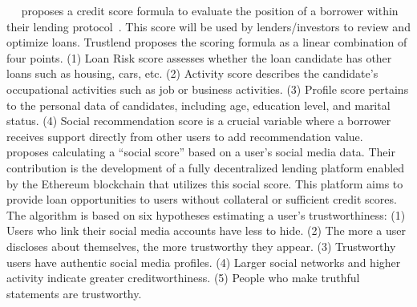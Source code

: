 \documentclass[../ICIT-Paper-2024.tex]{subfiles}
\begin{document}
~\citeauthor{uriawan2024decentralized}~\cite{uriawan2024decentralized} proposes a credit score formula to evaluate the position of a borrower within their lending protocol~\cite{uriawan2022trustlend}. This score will be used by lenders/investors to review and optimize loans. Trustlend proposes the scoring formula as a linear combination of four points. (1) Loan Risk score assesses whether the loan candidate has other loans such as housing, cars, etc. (2) Activity score describes the candidate's occupational activities such as job or business activities. (3) Profile score pertains to the personal data of candidates, including age, education level, and marital status. (4) Social recommendation score is a crucial variable where a borrower receives support directly from other users to add recommendation value.
~\citeauthor{hartmann2023privacy}~\cite{hartmann2023privacy} proposes calculating a “social score” based on a user's social media data. Their contribution is the development of a fully decentralized lending platform enabled by the Ethereum blockchain that utilizes this social score. This platform aims to provide loan opportunities to users without collateral or sufficient credit scores. The algorithm is based on six hypotheses estimating a user's trustworthiness: (1) Users who link their social media accounts have less to hide. (2) The more a user discloses about themselves, the more trustworthy they appear. (3) Trustworthy users have authentic social media profiles. (4) Larger social networks and higher activity indicate greater creditworthiness. (5) People who make truthful statements are trustworthy.
\end{document}
